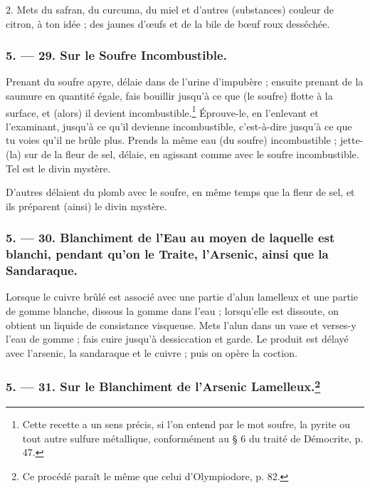 \documentclass[a4paper, 11pt, oneside, polutonikogreek, french]{article}
\begin{document}
2. Mets du safran, du curcuma, du miel et d'autres (substances) couleur de citron, à ton idée ; des jaunes d'œufs et de la bile de bœuf roux desséchée.

\bigskip
\centerline{\EightStarTaper}
\centerline{\EightStarTaper\EightStarTaper}
\bigskip

\subsubsection{5. --- 29. Sur le Soufre Incombustible.}

Prenant du soufre apyre, délaie dans de l'urine d'impubère ; ensuite prenant de la saumure en quantité égale, fais bouillir jusqu'à ce que (le soufre) flotte à la surface, et (alors) il devient incombustible.\footnote{Cette recette a un sens précis, si l'on entend par le mot soufre, la pyrite ou tout autre sulfure métallique, conformément au § 6 du traité de Démocrite, p. 47.} Éprouve-le, en l'enlevant et l'examinant, jusqu'à ce qu'il devienne incombustible, c'est-à-dire jusqu'à ce que tu voies qu'il ne brûle plus. Prends la même eau (du soufre) incombustible ; jette-(la) sur de la fleur de sel, délaie, en agissant comme avec le soufre incombustible. Tel est le divin mystère.

D'autres délaient du plomb avec le soufre, en même temps que la fleur de sel, et ils préparent (ainsi) le divin mystère.

\bigskip
\centerline{\EightStarTaper}
\centerline{\EightStarTaper\EightStarTaper}
\bigskip

\subsubsection{5. --- 30. Blanchiment de l'Eau au moyen de laquelle est blanchi, pendant qu'on le Traite, l'Arsenic, ainsi que la Sandaraque.}

Lorsque le cuivre brûlé est associé avec une partie d'alun lamelleux et une partie de gomme blanche, dissous la gomme dans l'eau ; lorsqu'elle est dissoute, on obtient un liquide de consistance visqueuse. Mets l'alun dans un vase et verses-y l'eau de gomme ; fais cuire jusqu'à dessiccation et garde. Le produit est délayé avec l'arsenic, la sandaraque et le cuivre ; puis on opère la coction.

\bigskip
\centerline{\EightStarTaper}
\centerline{\EightStarTaper\EightStarTaper}
\bigskip

\subsubsection[5. --- 31. Sur le Blanchiment de l'Arsenic Lamelleux.]{5. --- 31. Sur le Blanchiment de l'Arsenic Lamelleux.\footnote{Ce procédé paraît le même que celui d'Olympiodore, p. 82.}}
\end{document}
